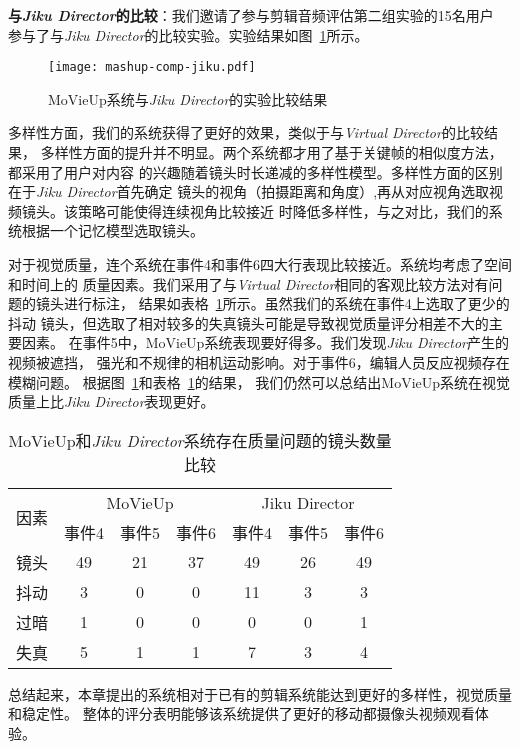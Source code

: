 \textbf{与\emph{Jiku Director}的比较}：我们邀请了参与剪辑音频评估第二组实验的15名用户
参与了与\emph{Jiku Director}的比较实验。实验结果如图~\ref{fig:mashup-comp-jiku}所示。
\begin{figure}[ht]
    \centering
    \texttt{[image: mashup-comp-jiku.pdf]}
    \caption{MoVieUp系统与\emph{Jiku Director}的实验比较结果}
    \label{fig:mashup-comp-jiku}
\end{figure}

多样性方面，我们的系统获得了更好的效果，类似于与\emph{Virtual Director}的比较结果，
多样性方面的提升并不明显。两个系统都才用了基于关键帧的相似度方法，都采用了用户对内容
的兴趣随着镜头时长递减的多样性模型。多样性方面的区别在于\emph{Jiku Director}首先确定
镜头的视角（拍摄距离和角度）,再从对应视角选取视频镜头。该策略可能使得连续视角比较接近
时降低多样性，与之对比，我们的系统根据一个记忆模型选取镜头。

对于视觉质量，连个系统在事件4和事件6四大行表现比较接近。系统均考虑了空间和时间上的
质量因素。我们采用了与\emph{Virtual Director}相同的客观比较方法对有问题的镜头进行标注，
结果如表格~\ref{tab:mashup-jiku-obj-comp}所示。虽然我们的系统在事件4上选取了更少的抖动
镜头，但选取了相对较多的失真镜头可能是导致视觉质量评分相差不大的主要因素。
在事件5中，MoVieUp系统表现要好得多。我们发现\emph{Jiku Director}产生的视频被遮挡，
强光和不规律的相机运动影响。对于事件6，编辑人员反应视频存在模糊问题。
根据图~\ref{tab:mashup-jiku-obj-comp}和表格~\ref{tab:mashup-jiku-obj-comp}的结果，
我们仍然可以总结出MoVieUp系统在视觉质量上比\emph{Jiku Director}表现更好。
\begin{table}[!t]
	\centering
    \caption{MoVieUp和\emph{Jiku Director}系统存在质量问题的镜头数量比较}
	\label{tab:mashup-jiku-obj-comp}
	\scriptsize
	\begin{tabular}{|c|c|c|c|c|c|c|}
		\hline
		\multirow{2}{*}{因素} & \multicolumn{3}{c|}{MoVieUp} &
		\multicolumn{3}{c|}{Jiku Director}  \\ \cline{2-7}
		& 事件4 & 事件5 & 事件6 & 事件4 & 事件5 & 事件6 \\ \hline
		镜头		& 49 & 21 & 37 & 49 & 26& 49 \\ \hline
		抖动	& 3 & 0 & 0 & 11 & 3& 3 \\ \hline
		过暗	& 1 & 0 & 0 & 0 & 0& 1 \\ \hline
		失真	& 5 & 1 & 1 & 7 & 3& 4 \\ \hline
	\end{tabular}
\end{table}

总结起来，本章提出的系统相对于已有的剪辑系统能达到更好的多样性，视觉质量和稳定性。
整体的评分表明能够该系统提供了更好的移动都摄像头视频观看体验。

